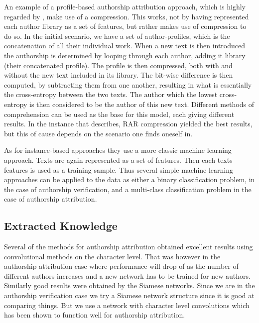 An example of a profile-based authorship attribution approach, which is highly
regarded by \citet{stamatos2009}, make use of a compression. This works, not
by having represented each author library as a set of features, but rather
makes use of compression to do so. In the initial scenario, we have a set of
author-profiles, which is the concatenation of all their individual work.
When a new text is then introduced the authorship is determined by looping
through each author, adding it library (their concatenated profile). The
profile is then compressed, both with and without the new text included in its
library. The bit-wise difference is then computed, by subtracting them from
one another, resulting in what is essentially the cross-entropy between the
two texts. The author which the lowest cross-entropy is then considered to be
the author of this new text. Different methods of comprehension can be used as
the base for this model, each giving different results. In the instance that
\citet{stamatos2009} describes, RAR compression yielded the best results, but
this of cause depends on the scenario one finds oneself in.

As for instance-based approaches they use a more classic machine learning
approach. Texts are again represented as a set of features. Then each texts
features is used as a training sample. Thus several simple machine learning
approaches can be applied to the data as either a binary classification problem,
in the case of authorship verification, and a multi-class classification problem
in the case of authorship attribution.


\subsection{Extracted Knowledge}

Several of the methods for authorship attribution obtained excellent results
using convolutional methods on the character level. That was however in the
authorship attribution case where performance will drop of as the number of
different authors increases and a new network has to be trained for new authors.
Similarly good results were obtained by the Siamese networks. Since we are in
the authorship verification case we try a Siamese network structure since it is
good at comparing things. But we use a network with character level convolutions
which has been shown to function well for authorship attribution.

